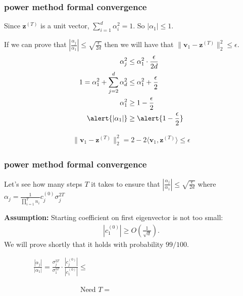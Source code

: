 \documentclass[compress]{beamer}
\newcommand{\bv}[1]{\mathbf{#1}}
\begin{document}
\begin{frame}[t]
	\frametitle{power method formal convergence}	
	Since $\bv{z}^{(T)}$ is a unit vector, $\sum_{i=1}^d \alpha_i^2 = 1$. So $|\alpha_1| \leq 1$. 
	
	If we can prove that \alert{$\left| \frac{\alpha_j}{\alpha_1}\right| \leq \sqrt{\frac{\epsilon}{2d}}$} then we will have that \alert{$\|\bv{v}_1 - \bv{z}^{(T)}\|_2^2 \leq \epsilon$}.
	\begin{align*}
		\alpha_j^2 &\leq \alpha_1^2 \cdot \frac{\epsilon}{2d}\\
		1 = \alpha_1^2 + \sum_{j=2}^d \alpha_d^2&\leq \alpha_1^2 + \frac{\epsilon}{2}\\
		 \alpha_1^2 &\geq 1-\frac{\epsilon}{2} \\
		 \alert{|\alpha_1|} &\geq \alert{1-\frac{\epsilon}{2}}
	\end{align*}

\begin{align*}
	\|\bv{v}_1 - \bv{z}^{(T)}\|_2^2 = 2 - 2\langle\bv{v}_1,\bv{z}^{(T)}\rangle \leq \epsilon
\end{align*}
	
	
\end{frame}
\begin{frame}[t]
	\frametitle{power method formal convergence}
	Let's see how many steps $T$ it takes to ensure that \alert{$\left|\frac{\alpha_j}{\alpha_1}\right| \leq \sqrt{\frac{\epsilon}{2d}}$} where $\alpha_j = \frac{1}{\prod_{i=1}^T n_i}c_j^{(0)}{\sigma_j^{2T}}$
	
	\textbf{Assumption:} Starting coefficient on first eigenvector is not too small:\vspace{-.5em}
	\begin{align*}
		\left| c_1^{(0)}\right| \geq   O\left(\frac{1}{\sqrt{d}}\right). 
	\end{align*}
	We will prove shortly that it holds with probability $99/100$.
	
	\begin{align*}
		\frac{|\alpha_j|}{|\alpha_1|} = \frac{\sigma_j^{2T}}{\sigma_1^{2T}} \cdot \frac{|c_j^{(0)}|}{|c_1^{(0)}|} \leq \hspace{20em}
	\end{align*}
	
	\begin{align*}
		\text{Need } T = \hspace{10em}
	\end{align*}
\end{frame}
\end{document}
